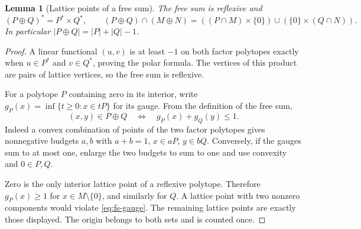 \documentclass[manuscript]{aomart}
\newtheorem{lemma}[theorem]{Lemma}
\theoremstyle{definition}
\theoremstyle{remark}
\begin{document}
\begin{lemma}[Lattice points of a free sum]\label{lem:fs-points}
The free sum is reflexive and
\[
 (P\oplus Q)^*=P^*\times Q^*,\qquad
 (P\oplus Q)\cap(M\oplus N)
 =((P\cap M)\times\{0\})\cup(\{0\}\times(Q\cap N)).
\]
In particular $|P\oplus Q|=|P|+|Q|-1$.
\end{lemma}
\begin{proof}
A linear functional $(u,v)$ is at least $-1$ on both factor polytopes
exactly when $u\in P^*$ and $v\in Q^*$, proving the polar formula.
The vertices of this product are pairs of lattice vertices, so the
free sum is reflexive.

For a polytope $P$ containing zero in its interior, write
$g_P(x)=\inf\{t\ge0:x\in tP\}$ for its gauge. From the definition of
the free sum,
\begin{equation}\label{eq:fs-gauge}
 (x,y)\in P\oplus Q\quad\Longleftrightarrow\quad
 g_P(x)+g_Q(y)\le1.
\end{equation}
Indeed a convex combination of points of the two factor polytopes
gives nonnegative budgets $a,b$ with $a+b=1$, $x\in aP$, $y\in bQ$.
Conversely, if the gauges sum to at most one, enlarge the two budgets
to sum to one and use convexity and $0\in P,Q$.

Zero is the only interior lattice point of a reflexive polytope.
Therefore $g_P(x)\ge1$ for $x\in M\setminus\{0\}$, and similarly for
$Q$. A lattice point with two nonzero components would violate
\eqref{eq:fs-gauge}. The remaining lattice points are exactly those
displayed. The origin belongs to both sets and is counted once.
\end{proof}
\end{document}
